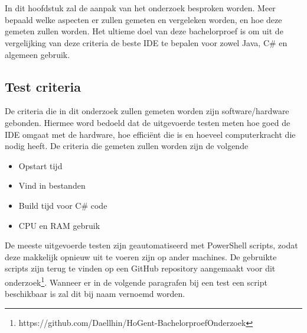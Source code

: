 \newcommand\verbatimOffset{-15pt}
\chapter{}
\label{ch:methodologie}


In dit hoofdstuk zal de aanpak van het onderzoek besproken worden. Meer bepaald welke aspecten er zullen gemeten en vergeleken worden, en hoe deze gemeten zullen worden. Het ultieme doel van deze bachelorproef is om uit de vergelijking van deze criteria de beste IDE te bepalen voor zowel Java, C\# en algemeen gebruik.

\section{Test criteria}
De criteria die in dit onderzoek zullen gemeten worden zijn software/hardware gebonden. Hiermee word bedoeld dat de uitgevoerde testen meten hoe goed de IDE omgaat met de hardware, hoe efficiënt die is en hoeveel computerkracht die nodig heeft. De criteria die gemeten zullen worden zijn de volgende

\begin{itemize}
	\item Opstart tijd
	\item Vind in bestanden
	\item Build tijd voor C\# code
	\item CPU en RAM gebruik
\end{itemize}

De meeste uitgevoerde testen zijn geautomatiseerd met PowerShell scripts, zodat deze makkelijk opnieuw uit te voeren zijn op ander machines. De gebruikte scripts zijn terug te vinden op een GitHub repository aangemaakt voor dit onderzoek\footnote{https://github.com/Daellhin/HoGent-BachelorproefOnderzoek}. Wanneer er in de volgende paragrafen bij een test een script beschikbaar is zal dit bij naam vernoemd worden.

